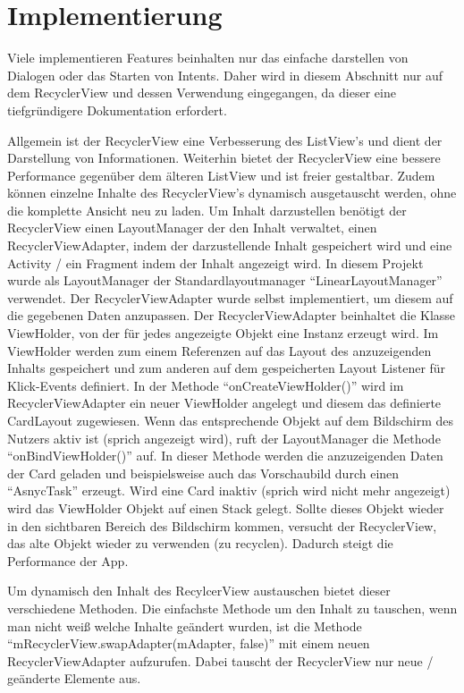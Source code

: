 
\chapter{Implementierung}

Viele implementieren Features beinhalten nur das einfache darstellen von Dialogen oder das Starten von Intents. Daher wird in diesem Abschnitt nur auf dem RecyclerView und dessen Verwendung eingegangen, da dieser eine tiefgründigere Dokumentation erfordert. 

Allgemein ist der RecyclerView eine Verbesserung des ListView's und dient der Darstellung von Informationen. Weiterhin bietet der RecyclerView eine bessere Performance gegenüber dem älteren ListView und ist freier gestaltbar. Zudem können einzelne Inhalte des RecyclerView's dynamisch ausgetauscht werden, ohne die komplette Ansicht neu zu laden. Um Inhalt darzustellen benötigt der RecyclerView  einen LayoutManager der den Inhalt verwaltet, einen RecyclerViewAdapter, indem der darzustellende Inhalt gespeichert wird und eine Activity / ein Fragment indem der Inhalt angezeigt wird. In diesem Projekt wurde als LayoutManager der Standardlayoutmanager \enquote{LinearLayoutManager} verwendet. Der RecyclerViewAdapter wurde selbst implementiert, um diesem auf die gegebenen Daten anzupassen. Der RecyclerViewAdapter beinhaltet die Klasse ViewHolder, von der für jedes angezeigte Objekt eine Instanz erzeugt wird. Im ViewHolder werden zum einem Referenzen auf das Layout des anzuzeigenden Inhalts gespeichert und zum anderen auf dem gespeicherten Layout Listener für Klick-Events definiert. In der Methode \enquote{onCreateViewHolder()} wird im RecyclerViewAdapter ein neuer ViewHolder angelegt und diesem das definierte CardLayout zugewiesen. Wenn das entsprechende Objekt auf dem Bildschirm des Nutzers aktiv ist (sprich angezeigt wird), ruft der LayoutManager die Methode \enquote{onBindViewHolder()} auf. In dieser Methode werden die anzuzeigenden Daten der Card geladen und beispielsweise auch das Vorschaubild durch einen \enquote{AsnycTask} erzeugt. Wird eine Card inaktiv (sprich wird nicht mehr angezeigt) wird das ViewHolder Objekt auf einen Stack gelegt. Sollte dieses Objekt wieder in den sichtbaren Bereich des Bildschirm kommen, versucht der RecyclerView, das alte Objekt wieder zu verwenden (zu recyclen). Dadurch steigt die Performance der App. 

Um dynamisch den Inhalt des RecylcerView austauschen bietet dieser verschiedene Methoden. Die einfachste Methode um den Inhalt zu tauschen, wenn man nicht weiß welche Inhalte geändert wurden, ist die Methode \enquote{mRecyclerView.swapAdapter(mAdapter, false)} mit einem neuen RecyclerViewAdapter aufzurufen. Dabei tauscht der RecyclerView nur neue / geänderte Elemente aus.

